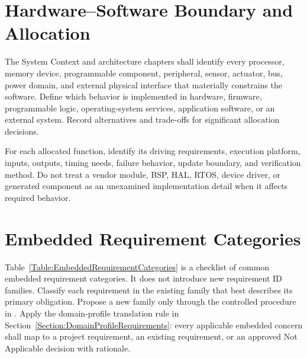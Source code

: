 \section{Hardware--Software Boundary and Allocation}
The System Context and architecture chapters shall identify every processor,
memory device, programmable component, peripheral, sensor, actuator, bus,
power domain, and external physical interface that materially constrains the
software. Define which behavior is implemented in hardware, firmware,
programmable logic, operating-system services, application software, or an
external system. Record alternatives and trade-offs for significant
allocation decisions.

For each allocated function, identify its driving requirements, execution
platform, inputs, outputs, timing needs, failure behavior, update boundary,
and verification method. Do not treat a vendor module, BSP, HAL, RTOS, device
driver, or generated component as an unexamined implementation detail when it
affects required behavior.

\section{Embedded Requirement Categories}
Table~\ref{Table:EmbeddedRequirementCategories} is a checklist of common
embedded requirement categories. It does not introduce new requirement ID
families. Classify each requirement in the existing family that best describes
its primary obligation. Propose a new family only through the controlled
procedure in . Apply the domain-profile translation
rule in Section~\ref{Section:DomainProfileRequirements}: every applicable
embedded concern shall map to a project requirement, an existing requirement,
or an approved Not Applicable decision with rationale.

